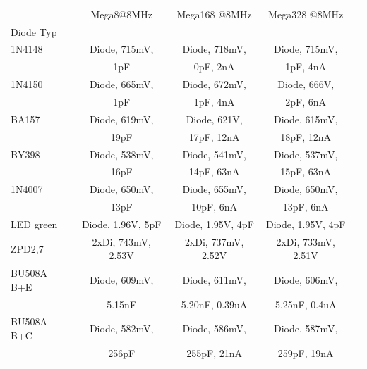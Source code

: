 \begin{table}[H]
  \begin{center}
    \begin{tabular}{| l | c | c | c | c |}
    \hline
           & Mega8@8MHz          & Mega168 @8MHz       & Mega328 @8MHz     \\
 Diode Typ &                     &                     &                   \\
    \hline
    \hline
1N4148     & Diode, 715mV,        & Diode, 718mV,            & Diode, 715mV,           \\
           &               1pF    &               0pF, 2nA   &               1pF, 4nA  \\
    \hline
1N4150     & Diode, 665mV,        & Diode, 672mV,            & Diode, 666V,           \\
           &               1pF    &               1pF, 4nA   &              2pF, 6nA  \\
    \hline
BA157      & Diode, 619mV,        & Diode, 621V,              & Diode, 615mV,            \\
           &               19pF   &              17pF, 12nA   &               18pF, 12nA \\
    \hline
BY398      & Diode, 538mV,        & Diode, 541mV,             & Diode, 537mV,            \\
           &               16pF   &               14pF, 63nA  &               15pF, 63nA \\
    \hline
1N4007     & Diode, 650mV,        & Diode, 655mV,            & Diode, 650mV,           \\
           &               13pF   &               10pF, 6nA  &               13pF, 6nA \\
    \hline
LED green  & Diode, 1.96V, 5pF    & Diode, 1.95V, 4pF   & Diode, 1.95V, 4pF \\
    \hline
ZPD2,7     & 2xDi, 743mV, 2.53V   & 2xDi, 737mV, 2.52V  & 2xDi, 733mV, 2.51V \\
    \hline
BU508A B+E & Diode, 609mV,        & Diode, 611mV,                & Diode, 606mV,              \\
           &               5.15nF &               5.20nF, 0.39uA &               5.25nF, 0.4uA\\
    \hline
BU508A B+C & Diode, 582mV,        & Diode, 586mV,             & Diode, 587mV,            \\
           &               256pF  &               255pF, 21nA &               259pF, 19nA\\

\end{tabular}
\end{center}
\end{table}
